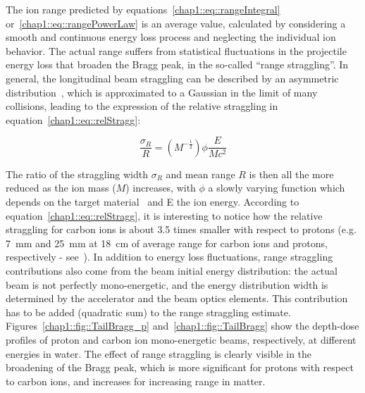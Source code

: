  
The ion range predicted by equations~\ref{chap1::eq::rangeIntegral} or~\ref{chap1::eq::rangePowerLaw}  is an average value, calculated by considering a smooth and continuous energy loss process and neglecting the individual ion behavior. The actual range suffers from statistical fluctuations in the projectile energy loss that broaden the Bragg peak, in the so-called \enquote{range straggling}. In general, the longitudinal beam straggling can be described by an asymmetric distribution~\parencite{Vavilov1957}, which is approximated to a Gaussian in the limit of many collisions, leading to the expression of the relative straggling in equation~\ref{chap1::eq::relStragg}:
 
 \begin{equation}
\frac{\sigma_{R}}{R} = (M^{-\frac{1}{2}})\phi\frac{E}{Mc^{2}}
\label{chap1::eq::relStragg}
\end{equation}

The ratio of the straggling width $\sigma_{R}$ and mean range $R$ is then all the more reduced as the ion mass ($M$) increases, with $\phi$ a slowly varying function which depends on the target material~\parencite{Rossi1952} and E the ion energy. According to equation~\ref{chap1::eq::relStragg}, it is interesting to notice how the relative straggling for carbon ions is about 3.5 times smaller with respect to protons (e.g. 7~mm and 25~mm at 18~cm of average range for carbon ions and protons, respectively - see~\cite{Durante2016}). In addition to energy loss fluctuations, range straggling contributions also come from the beam initial energy distribution: the actual beam is not perfectly mono-energetic, and the energy distribution width is determined by the accelerator and the beam optics elements. This contribution has to be added (quadratic sum) to the range straggling estimate. Figures~\ref{chap1::fig::TailBragg_p} and~\ref{chap1::fig::TailBragg} show the depth-dose profiles of proton and carbon ion mono-energetic beams, respectively, at different energies in water. The effect of range straggling is clearly visible in the broadening of the Bragg peak, which is more significant for protons with respect to carbon ions, and increases for increasing range in matter.  

